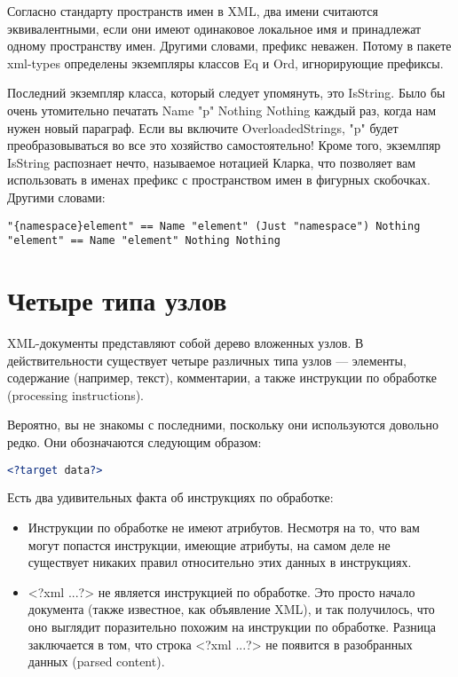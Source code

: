 Согласно стандарту пространств имен в XML, два имени считаются эквивалентными, если они имеют одинаковое локальное имя и принадлежат одному пространству имен. Другими словами, префикс неважен. Потому в пакете xml-types определены экземпляры классов Eq и Ord, игнорирующие префиксы.

Последний экземпляр класса, который следует упомянуть, это IsString. Было бы очень утомительно печатать Name "p" Nothing Nothing каждый раз, когда нам нужен новый параграф. Если вы включите OverloadedStrings, "p" будет преобразовываться во все это хозяйство самостоятельно! Кроме того, экземлпяр IsString распознает нечто, называемое нотацией Кларка, что позволяет вам использовать в именах префикс с пространством имен в фигурных скобочках. Другими словами:

\begin{lstlisting}
"{namespace}element" == Name "element" (Just "namespace") Nothing
"element" == Name "element" Nothing Nothing
\end{lstlisting}

\section{Четыре типа узлов} %

XML-документы представляют собой дерево вложенных узлов. В действительности существует четыре различных типа узлов --- элементы, содержание (например, текст), комментарии, а также инструкции по обработке (processing instructions).

\begin{remark}
Вероятно, вы не знакомы с последними, поскольку они используются довольно редко. Они обозначаются следующим образом:

\begin{lstlisting}[language=XML]
<?target data?>
\end{lstlisting}

Есть два удивительных факта об инструкциях по обработке:

\begin{itemize}
\item Инструкции по обработке не имеют атрибутов. Несмотря на то, что вам могут попастся инструкции, имеющие атрибуты, на самом деле не существует никаких правил относительно этих данных в инструкциях. %
\item <?xml ...?> не является инструкцией по обработке. Это просто начало документа (также известное, как объявление XML), и так получилось, что оно выглядит поразительно похожим на инструкции по обработке. Разница заключается в том, что строка <?xml ...?> не появится в разобранных данных (parsed content).
\end{itemize}

\end{remark}

